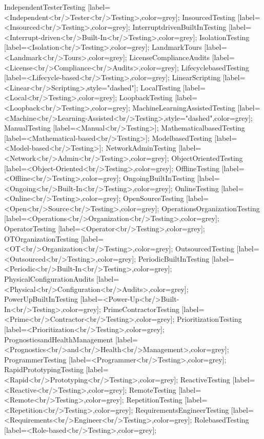 \documentclass{article}
\begin{document}
{IndependentTesterTesting [label=<Independent<br/>Tester<br/>Testing>,color=grey];
InsourcedTesting [label=<Insourced<br/>Testing>,color=grey];
InterruptdrivenBuiltInTesting [label=<Interrupt-driven<br/>Built-In<br/>Testing>,color=grey];
IsolationTesting [label=<Isolation<br/>Testing>,color=grey];
LandmarkTours [label=<Landmark<br/>Tours>,color=grey];
LicenseComplianceAudits [label=<License<br/>Compliance<br/>Audits>,color=grey];
LifecyclebasedTesting [label=<Lifecycle-based<br/>Testing>,color=grey];
LinearScripting [label=<Linear<br/>Scripting>,style="dashed"];
LocalTesting [label=<Local<br/>Testing>,color=grey];
LoopbackTesting [label=<Loopback<br/>Testing>,color=grey];
MachineLearningAssistedTesting [label=<Machine<br/>Learning-Assisted<br/>Testing>,style="dashed",color=grey];
ManualTesting [label=<Manual<br/>Testing>];
MathematicalbasedTesting [label=<Mathematical-based<br/>Testing>];
ModelbasedTesting [label=<Model-based<br/>Testing>];
NetworkAdminTesting [label=<Network<br/>Admin<br/>Testing>,color=grey];
ObjectOrientedTesting [label=<Object-Oriented<br/>Testing>,color=grey];
OfflineTesting [label=<Offline<br/>Testing>,color=grey];
OngoingBuiltInTesting [label=<Ongoing<br/>Built-In<br/>Testing>,color=grey];
OnlineTesting [label=<Online<br/>Testing>,color=grey];
OpenSourceTesting [label=<Open<br/>Source<br/>Testing>,color=grey];
OperationsOrganizationTesting [label=<Operations<br/>Organization<br/>Testing>,color=grey];
OperatorTesting [label=<Operator<br/>Testing>,color=grey];
OTOrganizationTesting [label=<OT<br/>Organization<br/>Testing>,color=grey];
OutsourcedTesting [label=<Outsourced<br/>Testing>,color=grey];
PeriodicBuiltInTesting [label=<Periodic<br/>Built-In<br/>Testing>,color=grey];
PhysicalConfigurationAudits [label=<Physical<br/>Configuration<br/>Audits>,color=grey];
PowerUpBuiltInTesting [label=<Power-Up<br/>Built-In<br/>Testing>,color=grey];
PrimeContractorTesting [label=<Prime<br/>Contractor<br/>Testing>,color=grey];
PrioritizationTesting [label=<Prioritization<br/>Testing>,color=grey];
PrognosticsandHealthManagement [label=<Prognostics<br/>and<br/>Health<br/>Management>,color=grey];
ProgrammerTesting [label=<Programmer<br/>Testing>,color=grey];
RapidPrototypingTesting [label=<Rapid<br/>Prototyping<br/>Testing>,color=grey];
ReactiveTesting [label=<Reactive<br/>Testing>,color=grey];
RemoteTesting [label=<Remote<br/>Testing>,color=grey];
RepetitionTesting [label=<Repetition<br/>Testing>,color=grey];
RequirementsEngineerTesting [label=<Requirements<br/>Engineer<br/>Testing>,color=grey];
RolebasedTesting [label=<Role-based<br/>Testing>,color=grey];
}
\end{document}
